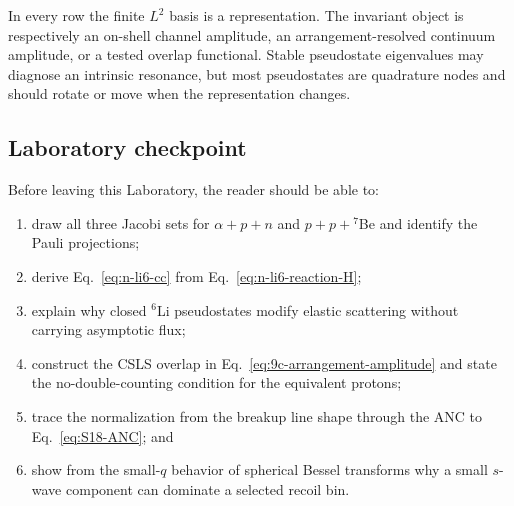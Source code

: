 In every row the finite $L^2$ basis is a representation.  The invariant
object is respectively an on-shell channel amplitude, an arrangement-resolved
continuum amplitude, or a tested overlap functional.  Stable pseudostate
eigenvalues may diagnose an intrinsic resonance, but most pseudostates are
quadrature nodes and should rotate or move when the representation changes.

\subsection*{Laboratory checkpoint}

Before leaving this Laboratory, the reader should be able to:
\begin{enumerate}[label=\arabic*.]
  \item draw all three Jacobi sets for $\alpha+p+n$ and $p+p+{}^7$Be and
  identify the Pauli projections;
  \item derive Eq.~\eqref{eq:n-li6-cc} from
  Eq.~\eqref{eq:n-li6-reaction-H};
  \item explain why closed $^6$Li pseudostates modify elastic scattering
  without carrying asymptotic flux;
  \item construct the CSLS overlap in
  Eq.~\eqref{eq:9c-arrangement-amplitude} and state the no-double-counting
  condition for the equivalent protons;
  \item trace the normalization from the breakup line shape through the ANC
  to Eq.~\eqref{eq:S18-ANC}; and
  \item show from the small-$q$ behavior of spherical Bessel transforms why a
  small $s$-wave component can dominate a selected recoil bin.
\end{enumerate}
